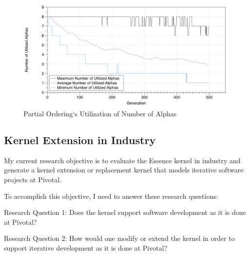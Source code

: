 \documentclass[preprint,12pt,3p]{elsarticle}
\begin{document}
\begin{figure}[ht]\vspace*{4pt}
\centerline{\includegraphics[width=5.00in]{genetic_programming/number_of_alphas_partial_ordering_500gens_40runs_8alpha}}
\caption{Partial Ordering`s Utilization of Number of Alphas}\vspace*{-6pt}
\label{NumberOfAlphasPartialOrdering}
\end{figure}


\subsection{Kernel Extension in Industry}
\label{PivotalKernelExtension}
My current research objective is to evaluate the Essence kernel in industry and generate a kernel extension or replacement kernel that models iterative software projects at Pivotal.

To accomplish this objective, I need to answer these research questions:

Research Question 1: Does the kernel support software development as it is done at Pivotal? 

Research Question 2: How would one modify or extend the kernel in order to support iterative development as it is done at Pivotal?
\end{document}
